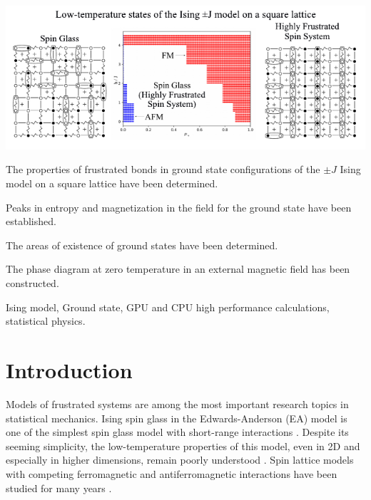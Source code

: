 \documentclass[preprint,12pt]{elsarticle}
\begin{document}
\begin{frontmatter}
\begin{abstract}
		\end{abstract}
		
		\begin{graphicalabstract}
		\includegraphics[width=1.2\linewidth]{Graphical Abstract.pdf}
		\end{graphicalabstract}
		
		
		\begin{highlights}
			\item The properties of frustrated bonds in ground state configurations of the $\pm J$ Ising model on a square lattice have been determined.  
			\item Peaks in entropy and magnetization in the field for the ground state have been established.  
			\item The areas of existence of ground states have been determined.  
			\item The phase diagram at zero temperature in an external magnetic field has been constructed.
		\end{highlights}  
		
		
		\begin{keyword}
			Ising model, Ground state, GPU and CPU high performance calculations, statistical physics.
		\end{keyword}
		
	\end{frontmatter}
	
	\linenumbers
	
	\tableofcontents
	
	\newpage
	\section{Introduction}
	
	Models of frustrated systems are among the most important research topics in statistical mechanics. Ising spin glass in the Edwards-Anderson (EA) model is one of the simplest spin glass model with short-range interactions \cite{edwards1975theory}. Despite its seeming simplicity, the low-temperature properties of this model, even in 2D and especially in higher dimensions, remain poorly understood \cite{pal1996ground, hartmann2011ground, newman2022ground}. Spin lattice models with competing ferromagnetic and antiferromagnetic interactions have been studied for many years \cite{binder1986spin, mezard1987spin, lebrecht2004plaquette, valdes2012j, lebrecht2015j, fan2023searching}.
	
\end{document}
